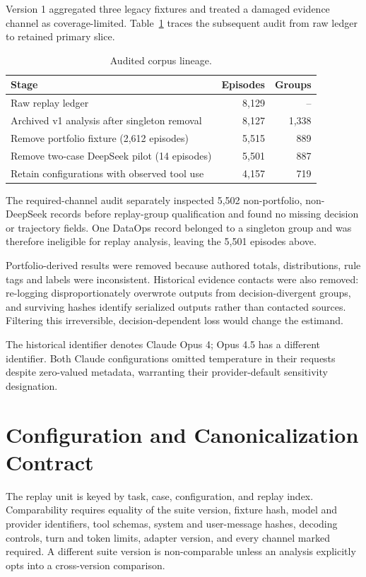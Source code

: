 \documentclass{article}
\begin{document}
Version 1 aggregated three legacy fixtures and treated a damaged evidence
channel as coverage-limited. Table~\ref{tab:lineage} traces the subsequent audit
from raw ledger to retained primary slice.

\begin{table}[htbp]
\caption{Audited corpus lineage.}
\label{tab:lineage}
\centering
\small
\begin{tabular}{@{}lrr@{}}
\toprule
Stage & Episodes & Groups \\
\midrule
Raw replay ledger & 8,129 & -- \\
Archived v1 analysis after singleton removal & 8,127 & 1,338 \\
Remove portfolio fixture (2,612 episodes) & 5,515 & 889 \\
Remove two-case DeepSeek pilot (14 episodes) & 5,501 & 887 \\
Retain configurations with observed tool use & 4,157 & 719 \\
\bottomrule
\end{tabular}
\end{table}

The required-channel audit separately inspected 5,502 non-portfolio,
non-DeepSeek records before replay-group qualification and found no missing
decision or trajectory fields.  One DataOps record belonged to a singleton
group and was therefore ineligible for replay analysis, leaving the 5,501
episodes above.

Portfolio-derived results were removed because authored totals, distributions,
rule tags and labels were inconsistent. Historical evidence contacts were also
removed: re-logging disproportionately overwrote outputs from decision-divergent
groups, and surviving hashes identify serialized outputs rather than contacted
sources. Filtering this irreversible, decision-dependent loss would change the estimand.

The historical identifier  denotes Claude Opus 4;
Opus 4.5 has a different identifier. Both Claude configurations omitted
temperature in their requests despite zero-valued metadata, warranting their
provider-default sensitivity designation.

\section{Configuration and Canonicalization Contract}
\label{app:contract}

The replay unit is keyed by task, case, configuration, and replay index.
Comparability requires equality of the suite version, fixture hash, model and
provider identifiers, tool schemas, system and user-message hashes, decoding
controls, turn and token limits, adapter version, and every channel marked
required.  A different suite version is non-comparable unless an analysis
explicitly opts into a cross-version comparison.
\end{document}
